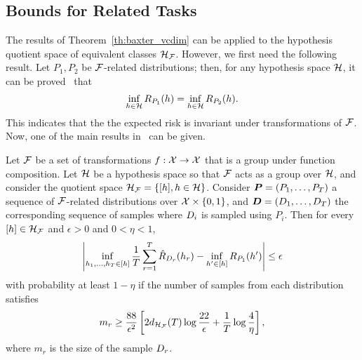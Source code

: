 \subsection{Bounds for Related Tasks}
The results of Theorem~\ref{th:baxter_vcdim} can be applied to the hypothesis quotient space of equivalent classes $\mathcal{H}_{\mathcal{F}}$. However, we first need the following result.
%
Let $P_1, P_2$ be $\mathcal{F}$-related distributions; then, for any hypothesis space $\mathcal{H}$, it can be proved~\cite[Lemma~2]{Ben-DavidB08} that
\begin{equation}
    \label{eq:ben-david_lemma2}
    \inf_{\hypf \in \hypspace} \risk_{P_1}(\hypf) = \inf_{\hypf \in \hypspace} \risk_{P_2}(\hypf).
\end{equation}
This indicates that the the expected risk is invariant under transformations of $\mathcal{F}$.
Now, one of the main results in~\citet[Theorem~2]{baxter2000model} can be given.
\begin{theorem}\label{th:ben-david_th2}
    Let $\mathcal{F}$ be a set of transformations $f: \mathcal{X} \to \mathcal{X}$ that is a group under function composition. Let $\mathcal{H}$ be a hypothesis space so that $\mathcal{F}$ acts as a group over $\mathcal{H}$, and consider the quotient space $\mathcal{H}_{\mathcal{F}} = \left\{\lbrack h\rbrack, h \in \mathcal{H}\right\}$.
    Consider $\bm{P} = (P_1, \ldots, P_T)$ a sequence of $\mathcal{F}$-related distributions over $\mathcal{X} \times \left\{0, 1\right\}$, and $\bm{D} = (D_1, \ldots, D_T)$ the corresponding sequence of samples  where $D_i$ is sampled using $P_i$. Then for every $\lbrack h\rbrack \in \mathcal{H}_{\mathcal{F}}$ and $\epsilon> 0$ and $0 < \eta < 1$, 
    \begin{equation}
        \nonumber
        \left|\inf_{h_1, \ldots, h_T \in \lbrack h\rbrack} \frac{1}{T} \sum_{r=1}^T \hat{R}_{D_r}(h_r) - \inf_{h' \in \lbrack h\rbrack}R_{P_1}(h')\right|  \leq \epsilon
    \end{equation}
    with probability at least $1 - \eta$ if the number of samples from each distribution satisfies
    \begin{equation}
        \label{eq:ben-david_sample_inequality}
        m_r \geq  \frac{88}{\epsilon^2} \left[2 d_{\hypspace_\frelset}(\ntasks) \log \frac{22}{\epsilon} + \frac{1}{\ntasks}\log\frac{4}{\eta} \right],
    \end{equation}
    where $m_r$ is the size of the sample $D_r$.
\end{theorem}
